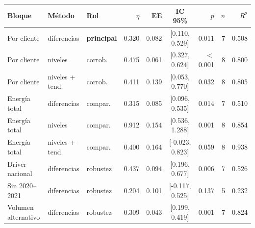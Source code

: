 
\begin{tabular}{lllrrcrrr}
\toprule
Bloque & Método & Rol & $\eta$ & EE & IC 95\% & $p$ & $n$ & $R^2$\\
\midrule
Por cliente & diferencias & \textbf{principal} & 0.320 & 0.082 & {}[0.110, 0.529] & 0.011 & 7 & 0.508\\
Por cliente & niveles & corrob. & 0.475 & 0.061 & {}[0.327, 0.624] & $<$0.001 & 8 & 0.800\\
Por cliente & niveles + tend. & corrob. & 0.411 & 0.139 & {}[0.053, 0.770] & 0.032 & 8 & 0.805\\
Energía total & diferencias & compar. & 0.315 & 0.085 & {}[0.096, 0.535] & 0.014 & 7 & 0.510\\
Energía total & niveles & compar. & 0.912 & 0.154 & {}[0.536, 1.288] & 0.001 & 8 & 0.854\\
Energía total & niveles + tend. & compar. & 0.400 & 0.164 & {}[-0.023, 0.823] & 0.059 & 8 & 0.938\\
Driver nacional & diferencias & robustez & 0.437 & 0.094 & {}[0.196, 0.677] & 0.006 & 7 & 0.526\\
Sin 2020--2021 & diferencias & robustez & 0.204 & 0.101 & {}[-0.117, 0.525] & 0.137 & 5 & 0.232\\
Volumen alternativo & diferencias & robustez & 0.309 & 0.043 & {}[0.199, 0.419] & 0.001 & 7 & 0.824\\
\bottomrule
\end{tabular}
